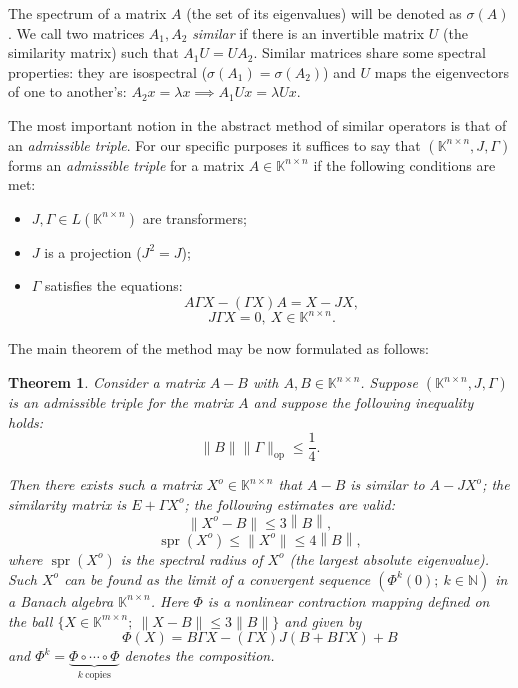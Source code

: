 \documentclass[a4paper]{article}
\newtheorem{thm}{Theorem}
\theoremstyle{definition}
\begin{document}
The spectrum of a matrix \( A \)
    (the set of its eigenvalues)
    will be denoted as \( \sigma(A) \).
We call two matrices \( A_1, A_2 \) \emph{similar}
    if there is an invertible matrix \( U \)
    (the similarity matrix)
    such that \( A_1 U = U A_2 \).
Similar matrices share some spectral properties:
    they are isospectral (\( \sigma(A_1) = \sigma(A_2) \))
    and \( U \) maps the eigenvectors of one to another's:
    \( A_2 x = \lambda x \implies A_1 U x = \lambda U x \).

The most important notion
    in the abstract method of similar operators
    is that of an \emph{admissible triple}.
For our specific purposes it suffices to say
    that \( (\mathbb{K}^{n{\times}n}, J, \Gamma) \)
    forms an \emph{admissible triple}
    for a matrix \( A\in\mathbb{K}^{n{\times}n} \)
    if the following conditions are met:
\begin{itemize}
    \item \( J, \Gamma \in L(\mathbb{K}^{n{\times}n}) \)
        are transformers;
    \item \( J \) is a projection (\( J^2 = J \));
    \item  \( \Gamma \) satisfies the equations:
        \[
            A \Gamma X - (\Gamma X) A = X - JX,
        \]
        \[
            J\Gamma X = 0,\ X\in\mathbb{K}^{n{\times}n}.
        \]
\end{itemize}

The main theorem of the method
    may be now formulated as follows:

\begin{thm}
    Consider a matrix \( A - B \)
        with \( A, B \in \mathbb{K}^{n{\times}n} \).
    Suppose \( (\mathbb{K}^{n{\times}n}, J, \Gamma) \)
        is an admissible triple for the matrix \( A \)
        and suppose the following inequality holds:
        \[
            \|B\|\|\Gamma\|_{\mathrm{op}} \leq \frac14.
        \]

    Then there exists such a matrix \( X^o\in\mathbb{K}^{n{\times}n} \)
        that \( A - B \) is similar to \( A - J X^o \);
        the similarity matrix is \( E + \Gamma X^o \);
        the following estimates are valid:
        \[
            \|X^o - B\| \leq 3 \left\|B\right\|,
        \]
        \[
            \operatorname{spr}(X^o) \leq \|X^o\| \leq 4 \left\|B\right\|,
        \]
        where \( \operatorname{spr}(X^o) \)
        is the spectral radius of \( X^o \) (the largest absolute eigenvalue).
    Such \( X^o \) can be found as the limit of a convergent sequence
        \( \left( \Phi^k(0);\ k\in\mathbb{N} \right) \)
        in a Banach algebra \( \mathbb{K}^{n{\times}n} \).
        Here \( \Phi \) is a nonlinear contraction mapping
        defined on the ball \( \{X\in\mathbb{K}^{m{\times}n};\ \|X-B\|\leq 3\|B\| \} \)
        and given by
    \[
        \Phi(X) = B\Gamma X - (\Gamma X)J(B + B\Gamma X) + B
    \]
        and \( \Phi^k = \underbrace{\Phi\circ\cdots\circ\Phi}_{k\ \text{copies}} \)
        denotes the composition.
\end{thm}
\end{document}
